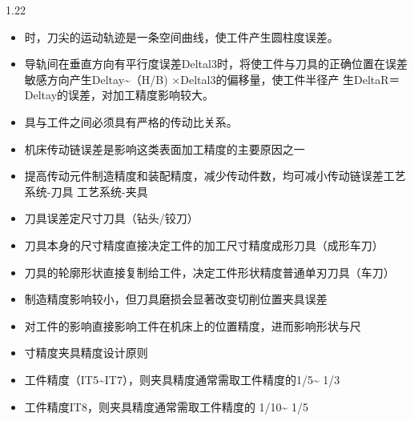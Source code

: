 \documentclass[12pt,a4paper]{article}
\begin{document}
\begin{spacing}{1.22}
\begin{itemize}[leftmargin=2.2em,label=--]
  \item 时，刀尖的运动轨迹是一条空间曲线，使工件产生圆柱度误差。
  \item 导轨间在垂直方向有平行度误差Deltal3时，将使工件与刀具的正确位置在误差敏感方向产生Deltay\textasciitilde{}（H/B) ×Deltal3的偏移量，使工件半径产 生DeltaR＝ Deltay的误差，对加工精度影响较大。
  \item 具与工件之间必须具有严格的传动比关系。
  \item 机床传动链误差是影响这类表面加工精度的主要原因之一
  \item 提高传动元件制造精度和装配精度，减少传动件数，均可减小传动链误差工艺系统-刀具 工艺系统-夹具
  \item 刀具误差定尺寸刀具（钻头/铰刀）
  \item 刀具本身的尺寸精度直接决定工件的加工尺寸精度成形刀具（成形车刀）
  \item 刀具的轮廓形状直接复制给工件，决定工件形状精度普通单刃刀具（车刀）
  \item 制造精度影响较小，但刀具磨损会显著改变切削位置夹具误差
  \item 对工件的影响直接影响工件在机床上的位置精度，进而影响形状与尺
  \item 寸精度夹具精度设计原则
  \item 工件精度（IT5\textasciitilde{}IT7），则夹具精度通常需取工件精度的1/5\textasciitilde{} 1/3
  \item 工件精度IT8，则夹具精度通常需取工件精度的 1/10\textasciitilde{} 1/5
\end{itemize}


\end{spacing}
\end{document}
